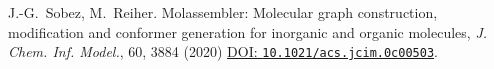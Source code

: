 \documentclass[]{tufte-book}
\begin{document}
\vspace{1cm}

J.-G.~Sobez, M.~Reiher. Molassembler: Molecular graph construction, modification
and conformer generation for inorganic and organic molecules, \textit{J. Chem. Inf.
Model.}, 60, 3884 (2020) \href{https://doi.org/10.1021/acs.jcim.0c00503}{DOI:
\texttt{10.1021/acs.jcim.0c00503}}.




\backmatter




\end{document}
